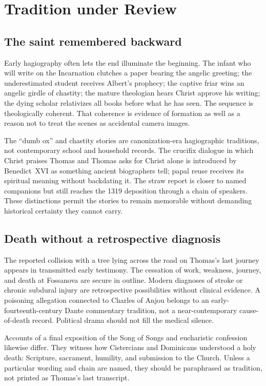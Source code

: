 \section{Tradition under Review}

\subsection{The saint remembered backward}

Early hagiography often lets the end illuminate the beginning.  The infant who
will write on the Incarnation clutches a paper bearing the angelic greeting;
the underestimated student receives Albert's prophecy; the captive friar wins
an angelic girdle of chastity; the mature theologian hears Christ approve his
writing; the dying scholar relativizes all books before what he has seen.  The
sequence is theologically coherent.  That coherence is evidence of formation
as well as a reason not to treat the scenes as accidental camera images.

The ``dumb ox'' and chastity stories are canonization-era hagiographic
traditions, not contemporary school and household records.  The crucifix
dialogue in which Christ praises Thomas and Thomas asks for Christ alone is
introduced by Benedict~XVI as something ancient biographers tell; papal reuse
receives its spiritual meaning without backdating it.  The straw report is
closer to named companions but still reaches the 1319 deposition through a
chain of speakers.  These distinctions permit the stories to remain memorable
without demanding historical certainty they cannot carry.

\subsection{Death without a retrospective diagnosis}

The reported collision with a tree lying across the road on Thomas's last
journey appears in transmitted early testimony.  The cessation of work,
weakness, journey, and death at Fossanova are
secure in outline.  Modern diagnoses of stroke or chronic subdural injury are
retrospective possibilities without clinical evidence.  A poisoning allegation
connected to Charles of Anjou belongs to an early-fourteenth-century Dante
commentary tradition, not a near-contemporary cause-of-death record.  Political
drama should not fill the medical silence.

Accounts of a final exposition of the Song of Songs and eucharistic confession
likewise differ.  They witness how Cistercians and Dominicans understood a holy
death: Scripture, sacrament, humility, and submission to the Church.  Unless a
particular wording and chain are named, they should be paraphrased as tradition,
not printed as Thomas's last transcript.

